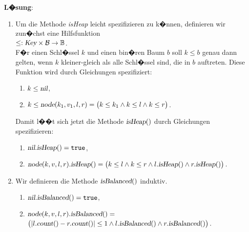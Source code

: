 \documentclass{article}
\begin{document}
\noindent
\textbf{L�sung}:
\begin{enumerate}
\item Um die Methode \textsl{isHeap} leicht spezifizieren zu k�nnen, definieren wir zun�chst
      eine Hilfsfunktion
      \\[0.2cm]
      \hspace*{1.3cm}
      $\leq : \textsl{Key} \times \mathcal{B} \rightarrow \mathbb{B}$.
      \\[0.2cm]
      F�r einen Schl�ssel $k$ und einen bin�ren Baum $b$ soll $k \leq b$ genau dann gelten,
      wenn $k$ kleiner-gleich als alle Schl�ssel sind, die in $b$ auftreten.
      Diese Funktion wird durch Gleichungen spezifiziert:
      \begin{enumerate}
      \item $k \leq \textsl{nil}$,
      \item $k \leq \textsl{node}(k_1,v_1,l,r) = \bigl(k \leq k_1 \wedge k \leq l \wedge k \leq r\bigr)$.
      \end{enumerate}
      Damit l��t sich jetzt die Methode $\textsl{isHeap}()$ durch Gleichungen spezifizieren:
      \begin{enumerate}
      \item $\textsl{nil}.\textsl{isHeap}() = \mathtt{true}$,
      \item $\textsl{node}(k,v,l,r).\textsl{isHeap}() = 
             \bigl(k \leq l \wedge k \leq r \wedge l.\textsl{isHeap}() \wedge r.\textsl{isHeap}()\bigr)$.
      \end{enumerate}
\item Wir definieren die Methode $\textsl{isBalanced}()$ induktiv.
      \begin{enumerate}
      \item $\textsl{nil}.\textsl{isBalanced}() = \mathtt{true}$,
      \item $\textsl{node}(k,v,l,r).\textsl{isBalanced}() =$ \\[0.1cm]
            \hspace*{\fill}
            $\bigl(|l.\textsl{count}() - r.\textsl{count}()| \leq 1 
             \wedge l.\textsl{isBalanced}()\wedge r.\textsl{isBalanced}()\bigr)$.
      \end{enumerate}
\end{enumerate}
\vspace{0.3cm}
\end{document}
